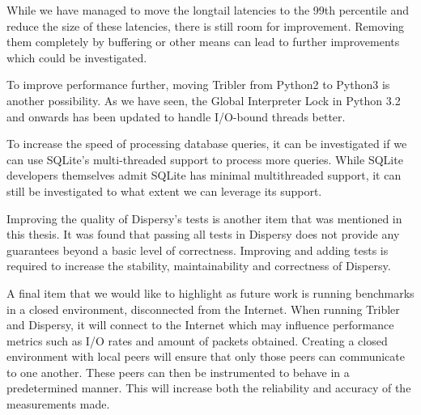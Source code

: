While we have managed to move the longtail latencies to the 99th percentile and reduce the size of these latencies, there is still room for improvement.
Removing them completely by buffering or other means can lead to further improvements which could be investigated.

To improve performance further, moving Tribler from Python2 to Python3 is another possibility.
As we have seen, the Global Interpreter Lock in Python 3.2 and onwards has been updated to handle I/O-bound threads better.

To increase the speed of processing database queries, it can be investigated if we can use SQLite's multi-threaded support to process more queries.
While SQLite developers themselves admit SQLite has minimal multithreaded support, it can still be investigated to what extent we can leverage its support.

Improving the quality of Dispersy's tests is another item that was mentioned in this thesis.
It was found that passing all tests in Dispersy does not provide any guarantees beyond a basic level of correctness.
Improving and adding tests is required to increase the stability, maintainability and correctness of Dispersy.

A final item that we would like to highlight as future work is running benchmarks in a closed environment, disconnected from the Internet.
When running Tribler and Dispersy, it will connect to the Internet which may influence performance metrics such as I/O rates and amount of packets obtained.
Creating a closed environment with local peers will ensure that only those peers can communicate to one another.
These peers can then be instrumented to behave in a predetermined manner.
This will increase both the reliability and accuracy of the measurements made.
